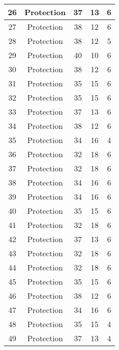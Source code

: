 \documentclass[results.tex]{subfiles}
\begin{document}
\begin{center}
\begin{tabular}{| c || c | c | c | c |}
    \hline
    26 & Protection & 37 & 13 & 6 \\ 
    \hline
    27 & Protection & 38 & 12 & 6 \\ 
    \hline
    28 & Protection & 38 & 12 & 5 \\ 
    \hline
    29 & Protection & 40 & 10 & 6 \\ 
    \hline
    30 & Protection & 38 & 12 & 6 \\ 
    \hline
    31 & Protection & 35 & 15 & 6 \\ 
    \hline
    32 & Protection & 35 & 15 & 6 \\ 
    \hline
    33 & Protection & 37 & 13 & 6 \\ 
    \hline
    34 & Protection & 38 & 12 & 6 \\ 
    \hline
    35 & Protection & 34 & 16 & 4 \\ 
    \hline
    36 & Protection & 32 & 18 & 6 \\ 
    \hline
    37 & Protection & 32 & 18 & 6 \\ 
    \hline
    38 & Protection & 34 & 16 & 6 \\ 
    \hline
    39 & Protection & 34 & 16 & 6 \\ 
    \hline
    40 & Protection & 35 & 15 & 6 \\ 
    \hline
    41 & Protection & 32 & 18 & 6 \\ 
    \hline
    42 & Protection & 37 & 13 & 6 \\ 
    \hline
    43 & Protection & 32 & 18 & 6 \\ 
    \hline
    44 & Protection & 32 & 18 & 6 \\ 
    \hline
    45 & Protection & 35 & 15 & 6 \\ 
    \hline
    46 & Protection & 38 & 12 & 6 \\ 
    \hline
    47 & Protection & 34 & 16 & 6 \\ 
    \hline
    48 & Protection & 35 & 15 & 4 \\ 
    \hline
    49 & Protection & 37 & 13 & 4 \\ 
    \hline   \end{tabular}
\end{center}
\end{document}
